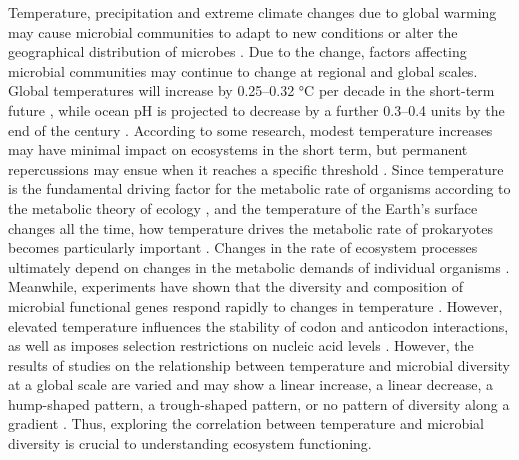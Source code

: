 \documentclass[11pt, a4paper]{article}
\begin{document}
\begin{spacing}{1.5}
Temperature, precipitation and extreme climate changes due to global warming may cause microbial communities to adapt to new conditions or alter the geographical distribution of microbes \citep{leducq2014local}. Due to the change, factors affecting microbial communities may continue to change at regional and global scales. Global temperatures will increase by 0.25–0.32 °C per decade in the short-term future \citep{smith2018predicted}, while ocean pH is projected to decrease by a further 0.3–0.4 units by the end of the century \citep{caldeira2003anthropogenic, hurd2018current}. According to some research, modest temperature increases may have minimal impact on ecosystems in the short term, but permanent repercussions may ensue when it reaches a specific threshold \citep{scheffer2003catastrophic}. Since temperature is the fundamental driving factor for the metabolic rate of organisms according to the metabolic theory of ecology   \citep{brown2004toward}, and the temperature of the Earth's surface changes all the time, how temperature drives the metabolic rate of prokaryotes becomes particularly important \citep{thompson2017communal}. Changes in the rate of ecosystem processes ultimately depend on changes in the metabolic demands of individual organisms \citep{zhou2016temperature}. Meanwhile, experiments have shown that the diversity and composition of microbial functional genes respond rapidly to changes in temperature \citep{barria2013bacterial, wu2017alpine, xue2016tundra}. However, elevated temperature influences the stability of codon and anticodon interactions, as well as imposes selection restrictions on nucleic acid levels \citep{basak2005origin}. However, the results of studies on the relationship between temperature and microbial diversity at a global scale are varied and may show a linear increase, a linear decrease, a hump-shaped pattern, a trough-shaped pattern, or no pattern of diversity along a gradient \citep{garcia2013temperature, hendershot2017consistently, zhou2016temperature}. Thus, exploring the correlation between temperature and microbial diversity is crucial to understanding ecosystem functioning.


\end{spacing}
\end{document}
